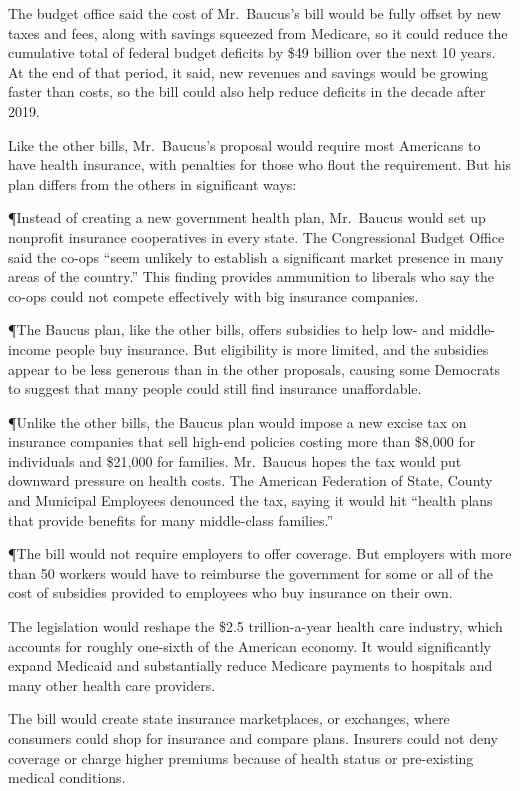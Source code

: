 ﻿\documentclass[12pt]{article}
\begin{document}
The budget office said the cost of Mr.~Baucus's bill would be fully offset by new taxes and fees,
along with savings squeezed from Medicare, so it could reduce the cumulative total of federal budget
deficits by \$49 billion over the next 10 years. At the end of that period, it said, new revenues
and savings would be growing faster than costs, so the bill could also help reduce deficits in the
decade after 2019.

Like the other bills, Mr.~Baucus's proposal would require most Americans to have health insurance,
with penalties for those who flout the requirement. But his plan differs from the others in
significant ways:

¶Instead of creating a new government health plan, Mr.~Baucus would set up nonprofit insurance
cooperatives in every state. The Congressional Budget Office said the co-ops ``seem unlikely to
establish a significant market presence in many areas of the country.'' This finding provides
ammunition to liberals who say the co-ops could not compete effectively with big insurance
companies.

¶The Baucus plan, like the other bills, offers subsidies to help low- and middle-income people buy
insurance. But eligibility is more limited, and the subsidies appear to be less generous than in the
other proposals, causing some Democrats to suggest that many people could still find insurance
unaffordable.

¶Unlike the other bills, the Baucus plan would impose a new excise tax on insurance companies that
sell high-end policies costing more than \$8,000 for individuals and \$21,000 for families.
Mr.~Baucus hopes the tax would put downward pressure on health costs. The American Federation of
State, County and Municipal Employees denounced the tax, saying it would hit ``health plans that
provide benefits for many middle-class families.''

¶The bill would not require employers to offer coverage. But employers with more than 50 workers
would have to reimburse the government for some or all of the cost of subsidies provided to
employees who buy insurance on their own.

The legislation would reshape the \$2.5 trillion-a-year health care industry, which accounts for
roughly one-sixth of the American economy. It would significantly expand Medicaid and substantially
reduce Medicare payments to hospitals and many other health care providers.

The bill would create state insurance marketplaces, or exchanges, where consumers could shop for
insurance and compare plans. Insurers could not deny coverage or charge higher premiums because of
health status or pre-existing medical conditions.
\end{document}
